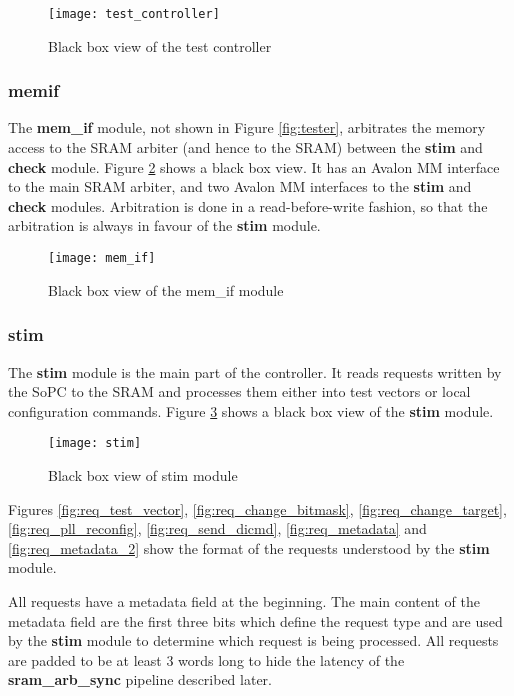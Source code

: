\begin{figure}
 \centering
 \texttt{[image: test\_controller]}
 \caption{Black box view of the test controller}
 \label{fig:bb_test_controller}
\end{figure}



\subsubsection{mem\textunderscore if}
The \textbf{mem\_if} module, not shown in Figure \ref{fig:tester}, arbitrates the memory access to the SRAM arbiter (and hence to the SRAM)
 between the \textbf{stim} and \textbf{check} module. Figure \ref{fig:bb_mem_if} shows a black box view. It has
an Avalon MM interface to the main SRAM arbiter, and two Avalon MM interfaces to the \textbf{stim} and
\textbf{check} modules. Arbitration is done in a read-before-write fashion, so that the arbitration is always
in favour of the \textbf{stim} module.

\begin{figure}
 \centering
 \texttt{[image: mem\_if]}
 \caption{Black box view of the mem\_if module}
 \label{fig:bb_mem_if}
\end{figure}



\subsubsection{stim}
The \textbf{stim} module is the main part of the controller. It reads requests written by the SoPC to the SRAM and
processes them either into test vectors or local configuration commands. Figure \ref{fig:bb_stim} shows a black box
view of the \textbf{stim} module.

\begin{figure}
 \centering
 \texttt{[image: stim]}
 \caption{Black box view of stim module}
 \label{fig:bb_stim}
\end{figure}



Figures \ref{fig:req_test_vector}, \ref{fig:req_change_bitmask},
\ref{fig:req_change_target}, \ref{fig:req_pll_reconfig}, \ref{fig:req_send_dicmd}, \ref{fig:req_metadata} and \ref{fig:req_metadata_2}
show the format of the requests understood by the \textbf{stim} module.

All requests have a metadata field at the beginning. The main content of the metadata field are the first three bits
which define the request type and are used by the \textbf{stim} module to determine which request is being processed.
All requests are padded to be at least 3 words long to hide the latency of the \textbf{sram\_arb\_sync} pipeline described
later.

